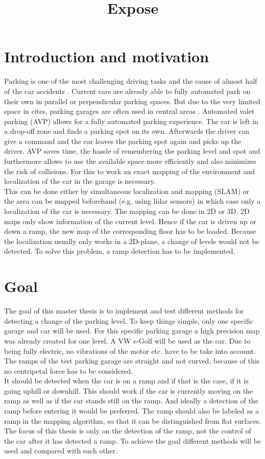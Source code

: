 \documentclass{paper}
\title{Expose}
\begin{document}
\maketitle
\section{Introduction and motivation}
Parking is one of the most challenging driving tasks and the cause of almost half of the car accidents \cite{accident}. Current cars are already able to fully automated park on their own in parallel or perpendicular parking spaces. But due to the very limited space in cites, parking garages are often used in central areas \cite{7995971}. Automated valet parking (AVP) allows for a fully automated parking experience. The car is left in a drop-off zone and finds a parking spot on its own. Afterwards the driver can give a command and the car leaves the parking spot again and picks up the driver. AVP saves time, the hassle of remembering the parking level and spot and furthermore allows to use the available space more efficiently and also minimizes the risk of collisions. For this to work an exact mapping of the environment and localization of the car in the garage is necessary.\\
This can be done either by simultaneous localization and mapping (SLAM) or the area can be mapped beforehand (e.g. using lidar sensors) in which case only a localization of the car is necessary.
The mapping can be done in 2D or 3D. 2D maps only show information of the current level. Hence if the car is driven up or down a ramp, the new map of the corresponding floor has to be loaded. Because the localization usually only works in a 2D-plane, a change of levels would not be detected. To solve this problem, a ramp detection has to be implemented. 

\section{Goal}
The goal of this master thesis is to implement and test different methods for detecting a change of the parking level. To keep things simple, only one specific garage and car will be used. For this specific parking garage a high precision map was already created for one level. A VW e-Golf will be used as the car. Due to being fully electric, no vibrations of the motor etc. have to be take into account. The ramps of the test parking garage are straight and not curved, because of this no centripetal force has to be considered.\\
It should be detected when the car is on a ramp and if that is the case, if it is going uphill or downhill. This should work if the car is currently moving on the ramp as well as if the car stands still on the ramp. And ideally a detection of the ramp before entering it would be preferred.  
The ramp should also be labeled as a ramp in the mapping algorithm, so that it can be distinguished from flat surfaces.
The focus of this thesis is only on the detection of the ramp, not the control of the car after it has detected a ramp.
To achieve the goal different methods will be used and compared with each other.
\end{document}
